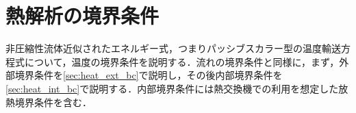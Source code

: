 %
\section{熱解析の境界条件}
\label{sec:thermal_condition}
非圧縮性流体近似されたエネルギー式，つまりパッシブスカラー型の温度輸送方程式について，温度の境界条件を説明する．流れの境界条件と同様に，まず，外部境界条件を\ref{sec:heat_ext_bc}で説明し，その後内部境界条件を\ref{sec:heat_int_bc}で説明する．内部境界条件には熱交換機での利用を想定した放熱境界条件を含む．

